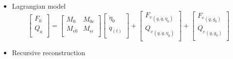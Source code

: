 \documentclass[compress]{thesisbeamer}
\begin{document}
\begin{frame}
\begin{itemize}
\begin{itemize}
  					\item Lagrangian model
  					\begin{equation}
  						\begin{bmatrix}
  						{F}_{0} \\
  						{Q}_{a}	\\
					\end{bmatrix} 
					= 
					\begin{bmatrix}
						{M}_{0}		& {M}_{0\epsilon} 				\\ 
						{M}_{\epsilon0}	& {M}_{\epsilon\epsilon}	\\
					\end{bmatrix}
					\begin{bmatrix}
						{\dot{\eta}}_{0} 	\\ 
						{\ddot{q}}_{(t)}	\\
					\end{bmatrix}	
					+
					\begin{bmatrix}
						{{F}_{v}}_{\left(q , \dot{q} , {\eta}_{0} \right)}	\\
						{{Q}_{v}}_{\left(q , \dot{q} , {\eta}_{0} \right)}	\\
					\end{bmatrix}
					+
					\begin{bmatrix}
						{{F}_{c}}_{\left(q , {g}_{0} \right)}	\\ 
						{{Q}_{c}}_{\left(q , {g}_{0} \right)}	\\
					\end{bmatrix}
  					\end{equation}
  					\item Recursive reconstruction
  				\end{itemize}
 			\end{itemize}
		\end{frame}
		
\end{document}
